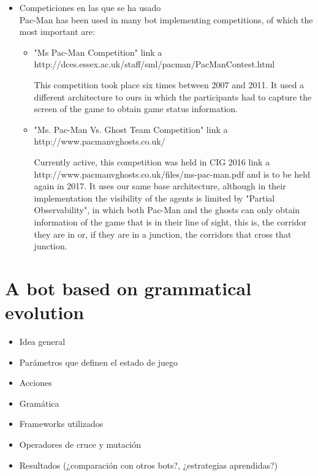 \documentclass{llncs}
\newcommand{\paco}{Pac-Man }
\begin{document}
\begin{itemize}
\item Competiciones en las que se ha usado
\\

\paco has been used in many bot implementing competitions, of which the most important are:

\begin{itemize}
\setlength{\itemindent}{-.3cm}
\item "Ms Pac-Man Competition"{\color{red} link a http://dces.essex.ac.uk/staff/sml/pacman/PacManContest.html}

This competition took place six times between 2007 and 2011. It used a different architecture to ours in which the participants had to capture the screen of the game to obtain game status information. 
\item "Ms. Pac-Man Vs. Ghost Team Competition"{\color{red} link a http://www.pacmanvghosts.co.uk/}

Currently active, this competition was held in CIG 2016{\color{red} link a http://www.pacmanvghosts.co.uk/files/ms-pac-man.pdf} and is to be held again in 2017. It uses our same base architecture, although in their implementation the visibility of the agents is limited by "Partial Observability", in which both \paco and the ghosts can only obtain information of the game that is in their line of sight, this is, the corridor they are in or, if they are in a junction, the corridors that cross that junction.
\end{itemize}

 


\end{itemize}


%
\section{A bot based on grammatical evolution}
\label{sec:sec1}
%

\begin{itemize}
\item Idea general
\item Parámetros que definen el estado de juego
\item Acciones
\item Gramática
\item Frameworks utilizados
\item Operadores de cruce y mutación
\item Resultados (¿comparación con otros bots?, ¿estrategias aprendidas?)
\end{itemize}
\end{document}
